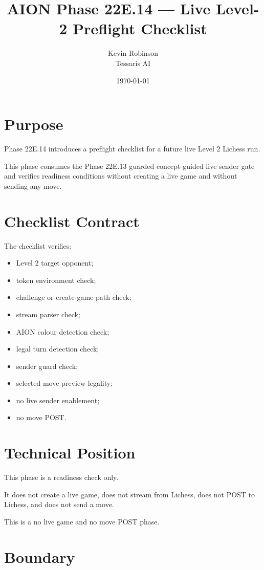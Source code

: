 \documentclass[11pt,a4paper]{article}
\title{\textbf{AION Phase 22E.14 --- Live Level-2 Preflight Checklist}}
\author{Kevin Robinson\\Tessaris AI}
\date{\today}
\begin{document}
\maketitle

\section{Purpose}

Phase 22E.14 introduces a preflight checklist for a future live Level 2 Lichess run.

This phase consumes the Phase 22E.13 guarded concept-guided live sender gate and verifies readiness conditions without creating a live game and without sending any move.

\section{Checklist Contract}

The checklist verifies:

\begin{itemize}[leftmargin=*]
  \item Level 2 target opponent;
  \item token environment check;
  \item challenge or create-game path check;
  \item stream parser check;
  \item AION colour detection check;
  \item legal turn detection check;
  \item sender guard check;
  \item selected move preview legality;
  \item no live sender enablement;
  \item no move POST.
\end{itemize}

\section{Technical Position}

This phase is a readiness check only.

It does not create a live game, does not stream from Lichess, does not POST to Lichess, and does not send a move.

This is a no live game and no move POST phase.

\section{Boundary}
\end{document}
